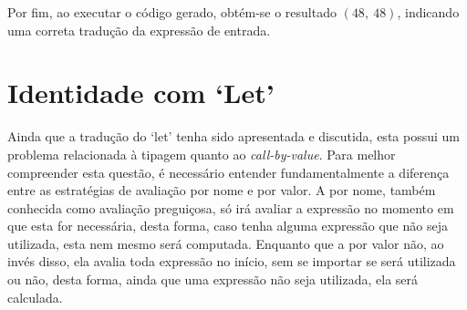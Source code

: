 Por fim, ao executar o código gerado, obtém-se o resultado $(48,\ 48)$, indicando uma correta tradução da expressão de entrada.
\section{Identidade com `Let'}
Ainda que a tradução do `let' tenha sido apresentada e discutida, esta possui um problema relacionada à tipagem quanto ao \textit{call-by-value}.
Para melhor compreender esta questão, é necessário entender fundamentalmente a diferença entre as estratégias de avaliação por nome e por valor.
A por nome, também conhecida como avaliação preguiçosa, só irá avaliar a expressão no momento em que esta for necessária, desta forma, caso tenha alguma expressão que não seja utilizada, esta nem mesmo será computada.
Enquanto que a por valor não, ao invés disso, ela avalia toda expressão no início, sem se importar se será utilizada ou não, desta forma, ainda que uma expressão não seja utilizada, ela será calculada.

